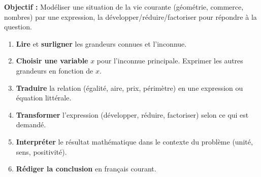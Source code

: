 \documentclass[11pt]{article}
\begin{document}
\begin{methode}
    \textbf{Objectif :} Modéliser une situation de la vie courante (géométrie, commerce, nombres) par une expression, la développer/réduire/factoriser pour répondre à la question.
    \begin{enumerate}
        \item \textbf{Lire} et \textbf{surligner} les grandeurs connues et l'inconnue.
        \item \textbf{Choisir une variable} $x$ pour l'inconnue principale. Exprimer les autres grandeurs en fonction de $x$.
        \item \textbf{Traduire} la relation (égalité, aire, prix, périmètre) en une expression ou équation littérale.
        \item \textbf{Transformer} l'expression (développer, réduire, factoriser) selon ce qui est demandé.
        \item \textbf{Interpréter} le résultat mathématique dans le contexte du problème (unité, sens, positivité).
        \item \textbf{Rédiger la conclusion} en français courant.
    \end{enumerate}
\end{methode}
\end{document}

